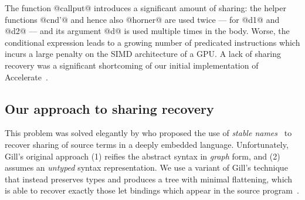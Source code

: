 The function @callput@ introduces a significant amount of sharing: the helper functions
@cnd'@ and hence also @horner@ are used twice --- for @d1@ and @d2@ --- and its
argument @d@ is used multiple times in the body. Worse, the conditional expression leads to a
growing number of predicated instructions which incurs a large penalty on the SIMD architecture of
a GPU\@. A lack of sharing recovery was a significant shortcoming of our initial implementation of
Accelerate~\cite{Chakravarty:2011fr}.

%


\subsection{Our approach to sharing recovery}

This problem was solved elegantly by \citet{Gill:2009dx} who proposed the use
of \emph{stable names}~\cite{PeytonJones:2000ks} to recover
sharing of source terms in a deeply embedded language. Unfortunately, Gill's
original approach (1) reifies the abstract syntax in \emph{graph} form, and (2)
assumes an \emph{untyped} syntax representation. We use a variant of Gill's
technique that instead preserves types and produces a tree with minimal
flattening, which is able to recover exactly those let bindings which appear in
the source program~\cite{McDonell:2013wi}.

